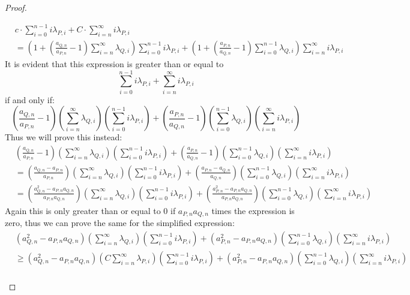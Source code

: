 \begin{proof}
\begin{enumerate}
\begin{align*}
    &c \cdot \sum_{i=0}^{n-1} i \lambda_{P,i} + C \cdot \sum_{i=n}^\infty i \lambda_{P,i} \\
    &= \left(1 + (\frac{a_{Q,n}}{a_{P,n}}-1)\sum_{i=n}^{\infty}\lambda_{Q,i}\right)  \sum_{i=0}^{n-1} i \lambda_{P,i} + \left(1 + (\frac{a_{P,n}}{a_{Q,n}}-1) \sum_{i=0}^{n-1}\lambda_{Q,i}\right) \sum_{i=n}^\infty i \lambda_{P,i}
   \end{align*}
   It is evident that this expression is greater than or equal to $$\sum_{i=0}^{n-1}i \lambda_{P,i} + \sum_{i=n}^\infty i \lambda_{P,i}$$
   if and only if:
   $$(\frac{a_{Q,n}}{a_{P,n}}-1)\left(\sum_{i=n}^{\infty}\lambda_{Q,i}\right)\left(\sum_{i=0}^{n-1} i \lambda_{P,i}\right) + (\frac{a_{P,n}}{a_{Q,n}}-1) \left(\sum_{i=0}^{n-1}\lambda_{Q,i}\right)\left(\sum_{i=n}^\infty i \lambda_{P,i}\right)$$
   Thus we will prove this instead:
   \begin{align*}
    &(\frac{a_{Q,n}}{a_{P,n}}-1)\left(\sum_{i=n}^{\infty}\lambda_{Q,i}\right)\left(\sum_{i=0}^{n-1} i \lambda_{P,i}\right) + (\frac{a_{P,n}}{a_{Q,n}}-1) \left(\sum_{i=0}^{n-1}\lambda_{Q,i}\right)\left(\sum_{i=n}^\infty i \lambda_{P,i}\right) \\
    &= (\frac{a_{Q,n} - a_{P,n}}{a_{P,n}})\left(\sum_{i=n}^{\infty}\lambda_{Q,i}\right)\left(\sum_{i=0}^{n-1} i \lambda_{P,i}\right) + (\frac{a_{P,n} - a_{Q,n}}{a_{Q,n}}) \left(\sum_{i=0}^{n-1}\lambda_{Q,i}\right)\left(\sum_{i=n}^\infty i \lambda_{P,i}\right) \\
    &= (\frac{a_{Q,n}^2 - a_{P,n}a_{Q,n}}{a_{P,n}a_{Q,n}})\left(\sum_{i=n}^{\infty}\lambda_{Q,i}\right)\left(\sum_{i=0}^{n-1} i \lambda_{P,i}\right) + (\frac{a_{P,n}^2 - a_{P,n}a_{Q,n}}{a_{P,n}a_{Q,n}}) \left(\sum_{i=0}^{n-1}\lambda_{Q,i}\right)\left(\sum_{i=n}^\infty i \lambda_{P,i}\right)
   \end{align*}
   Again this is only greater than or equal to $0$ if $a_{P,n}a_{Q,n}$ times the expression is zero,
   thus we can prove the same for the simplified expression:
   \begin{align*}
    &(a_{Q,n}^2 - a_{P,n}a_{Q,n})\left(\sum_{i=n}^{\infty}\lambda_{Q,i}\right)\left(\sum_{i=0}^{n-1} i \lambda_{P,i}\right) + (a_{P,n}^2 - a_{P,n}a_{Q,n}) \left(\sum_{i=0}^{n-1}\lambda_{Q,i}\right)\left(\sum_{i=n}^\infty i \lambda_{P,i}\right)\\
    &\geq (a_{Q,n}^2 - a_{P,n}a_{Q,n})\left(C\sum_{i=n}^{\infty}\lambda_{P,i}\right)\left(\sum_{i=0}^{n-1} i \lambda_{P,i}\right) + (a_{P,n}^2 - a_{P,n}a_{Q,n}) \left(\sum_{i=0}^{n-1}\lambda_{Q,i}\right)\left(\sum_{i=n}^\infty i \lambda_{P,i}\right)\\

\end{align*}
\end{enumerate}
\end{proof}
